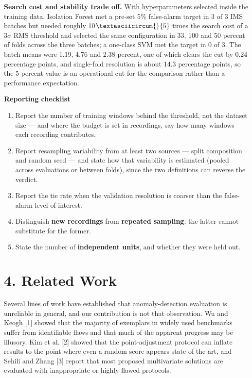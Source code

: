 \documentclass[11pt]{article}
\begin{document}
\textbf{Search cost and stability trade off.} With hyperparameters selected inside the training data, Isolation Forest met a pre-set 5\% false-alarm target in 3 of 3 IMS batches but needed roughly 10$\textasciicircum{}{5}$ times the search cost of a 3$\sigma$ RMS threshold and selected the same configuration in 33, 100 and 50 percent of folds across the three batches; a one-class SVM met the target in 0 of 3. The batch means were 1.19, 4.76 and 2.38 percent, one of which clears the cut by 0.24 percentage points, and single-fold resolution is about 14.3 percentage points, so the 5 percent value is an operational cut for the comparison rather than a performance expectation.

\textbf{Reporting checklist}

\begin{enumerate}
  \item Report the number of training windows behind the threshold, not the dataset size --- and where the budget is set in recordings, say how many windows each recording contributes.
  \item Report resampling variability from at least two sources --- split composition and random seed --- and state how that variability is estimated (pooled across evaluations or between folds), since the two definitions can reverse the verdict.
  \item Report the tie rate when the validation resolution is coarser than the false-alarm level of interest.
  \item Distinguish \textbf{new recordings} from \textbf{repeated sampling}; the latter cannot substitute for the former.
  \item State the number of \textbf{independent units}, and whether they were held out.
\end{enumerate}



\section{4. Related Work}

Several lines of work have established that anomaly-detection evaluation is unreliable in general, and our contribution is not that observation. Wu and Keogh [1] showed that the majority of exemplars in widely used benchmarks suffer from identifiable flaws and that much of the apparent progress may be illusory. Kim et al. [2] showed that the point-adjustment protocol can inflate results to the point where even a random score appears state-of-the-art, and Sehili and Zhang [3] report that most proposed multivariate solutions are evaluated with inappropriate or highly flawed protocols.
\end{document}
